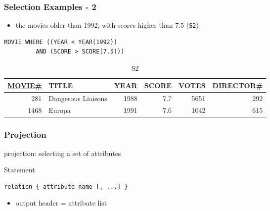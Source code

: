 \documentclass[dvipsnames]{beamer}
\theoremstyle{plain}
\begin{document}
\begin{frame}[fragile]
  \frametitle{Selection Examples - 2}

  \begin{example}
    \begin{itemize}
      \item the movies older than 1992, with scores higher than 7.5
        (\texttt{S2})
    \end{itemize}

    \begin{lstlisting}
MOVIE WHERE ((YEAR < YEAR(1992))
         AND (SCORE > SCORE(7.5)))
    \end{lstlisting}

    \pause
    \vspace{-10pt}
    \begin{tiny}
    \begin{table}
      \caption{S2}
      \begin{tabular}{|r|l|r|r|r|r|}\hline
\underline{MOVIE\#} & TITLE & YEAR & SCORE & VOTES & DIRECTOR\#\\[2pt]\hline\hline
   281 & Dangerous Liaisons & 1988 &   7.7 &  5651 &        292\\\hline
  1468 & Europa             & 1991 &   7.6 &  1042 &        615\\\hline
      \end{tabular}
    \end{table}
    \end{tiny}
  \end{example}
\end{frame}

\begin{frame}[fragile]
  \frametitle{Projection}

  \begin{definition}
    \alert{projection}: selecting a set of attributes
  \end{definition}

  \pause
  \begin{block}{Statement}
    \begin{lstlisting}
relation { attribute_name [, ...] }
    \end{lstlisting}
  \end{block}

  \pause
  \begin{itemize}
    \item output header = attribute list
  \end{itemize}
\end{frame}
\end{document}

